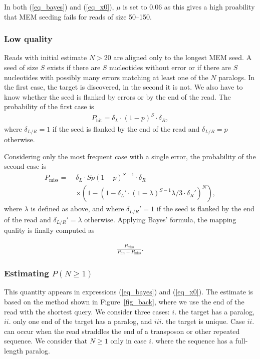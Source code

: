 \documentclass[english]{article}
\begin{document}
In both (\ref{eq_bayes}) and (\ref{eq_x0}), $\mu$ is set to 0.06 as this
gives a high proability that MEM seeding fails for reads of size 50--150.


\subsubsection{Low quality} Reads with initial estimate $N > 20$ are
aligned only to the longest MEM seed. A seed of size $S$ exists if
there are $S$ nucleotides without error or if there are $S$ nucleotides
with possibly many errors matching at least one of the $N$ paralogs. In the
first case, the target is discovered, in the second it is not. We also have
to know whether the seed is flanked by errors or by the end of the read.
The probability of the first case is
\begin{align*}
P_{\text{hit}} = \delta_L \cdot (1-p)^S \cdot \delta_R,
\end{align*}
where $\delta_{L/R} = 1$ if the seed is flanked by the end of the read and
$\delta_{L/R} = p$ otherwise.

Considering only the most frequent case with a single error, the
probability of the second case is
\begin{equation*}
\begin{split}
P_{\text{miss}} = \; &\delta_L \cdot Sp(1-p)^{S-1} \cdot \delta_R  \\
   &\times \left(1- \left( 1-\delta_L' \cdot(1-\lambda)^{S-1}\lambda/3
   \cdot \delta_R'\right)^N \right),
\end{split}
\end{equation*}
where $\lambda$ is defined as above, and where $\delta_{L/R}' = 1$ if the
seed is flanked by the end of the read and $\delta_{L/R}' = \lambda$ otherwise.
Applying Bayes' formula, the mapping quality is finally computed as

\begin{align}
\label{eq_low}
\frac{P_{\text{miss}}}{P_{\text{hit}} + P_{\text{miss}}}.
\end{align}

\subsubsection{Estimating $P(N \geq 1)$} This quantity appears in
expressions (\ref{eq_bayes}) and (\ref{eq_x0}). The estimate is based on
the method shown in Figure~\ref{fig_back}, where we use the end of the
read with the shortest query. We consider three cases: $i.$ the target has
a paralog, $ii.$ only one end of the target has a paralog, and $iii.$ the
target is unique. Case $ii.$ can occur when the read straddles the end of
a transposon or other repeated sequence. We consider that $N \geq 1$ only
in case $i.$ where the sequence has a full-length paralog.
\end{document}
